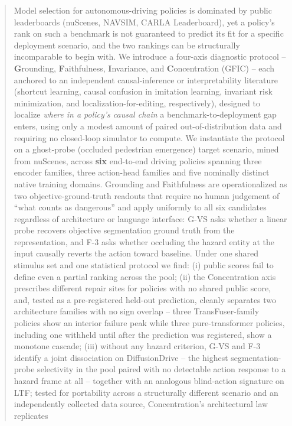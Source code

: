 \begin{abstract}
Model selection for autonomous-driving policies is dominated by public leaderboards
(nuScenes, NAVSIM, CARLA Leaderboard), yet a policy's rank on such a benchmark is not
guaranteed to predict its fit for a specific deployment scenario, and the two rankings
can be structurally incomparable to begin with. We introduce a four-axis diagnostic
protocol -- \textbf{G}rounding, \textbf{F}aithfulness, \textbf{I}nvariance, and
\textbf{C}oncentration (GFIC) -- each anchored to an independent causal-inference or
interpretability literature (shortcut learning, causal confusion in imitation learning,
invariant risk minimization, and localization-for-editing, respectively), designed to
localize \emph{where in a policy's causal chain} a benchmark-to-deployment gap enters,
using only a modest amount of paired out-of-distribution data and requiring no
closed-loop simulator to compute. We instantiate the protocol on a ghost-probe (occluded
pedestrian emergence) target scenario, mined from nuScenes, across \textbf{six}
end-to-end driving policies spanning three encoder families, three action-head families
and five nominally distinct native training domains. Grounding and Faithfulness are operationalized as two objective-ground-truth readouts
that require no human judgement of ``what counts as dangerous'' and apply uniformly to
all six candidates regardless of architecture or language interface: G-VS asks whether a
linear probe recovers objective segmentation ground truth from the representation, and
F-3 asks whether occluding the hazard entity at the input causally reverts the action
toward baseline. Under one shared stimulus set and one statistical protocol we find: (i)
public scores fail to define even a partial ranking across the pool; (ii) the
Concentration axis prescribes different repair sites for policies with no shared public
score, and, tested as a pre-registered held-out prediction, cleanly separates two
architecture families with no sign overlap -- three TransFuser-family policies show an
interior failure peak while three pure-transformer policies, including one withheld
until after the prediction was registered, show a monotone cascade; (iii) without any
hazard criterion, G-VS and F-3 identify a joint dissociation on DiffusionDrive -- the
highest segmentation-probe selectivity in the pool paired with no detectable action
response to a hazard frame at all -- together with an analogous blind-action signature on
LTF; tested for portability across a structurally different scenario and an
independently collected data source, Concentration's architectural law replicates

\end{abstract}
